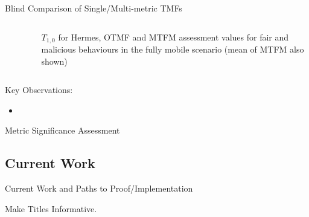 \documentclass{beamer}
\begin{document}
\begin{frame}[allowframebreaks,t]{Blind Comparison of Single/Multi-metric TMFs}
  \vspace{-24pt}%
  \begin{columns}
    \begin{column}[T]{0.5\textwidth}
      \begin{figure}[t]
        \centering
        \hfil
        \renewcommand{\thesubfigure}{c}%
        \label{fig:otmf_beta_comparison}
      \end{figure}%
    \end{column}
    \begin{column}[T]{0.5\textwidth}
      \begin{figure}[t]
        \centering
        \vspace{0pt}%
        \renewcommand{\thesubfigure}{b}%
        \label{fig:otmf_beta_comparison}
      \end{figure}
      $T_{1,0}$ for Hermes, OTMF and MTFM assessment values for fair and malicious behaviours in the fully mobile scenario (mean of MTFM also shown)

    \end{column}
  \end{columns}

  \framebreak

  Key Observations:
  \begin{itemize}
    \item 
  \end{itemize}

\end{frame}

\begin{frame}{Metric Significance Assessment}
\end{frame}

\subsection{Current Work}{Current Work and Paths to Proof/Implementation}

\begin{frame}{Make Titles Informative.}
\end{frame}
\end{document}
